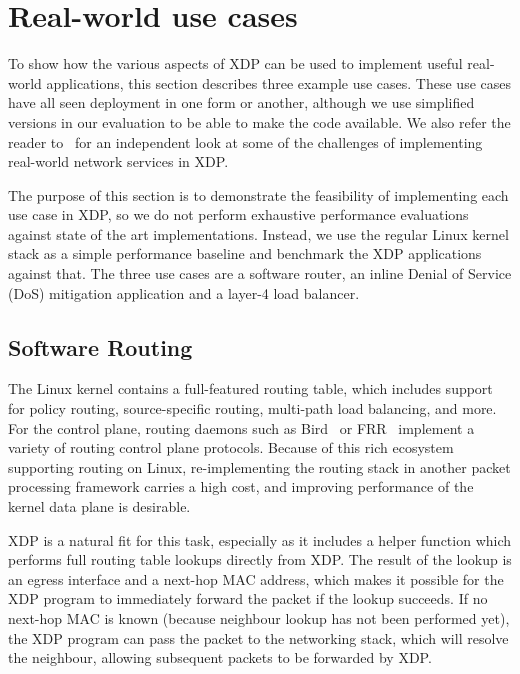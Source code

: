 \documentclass[sigconf]{acmart}
\begin{document}
\section{Real-world use cases}
\label{sec:usecases}
To show how the various aspects of XDP can be used to implement useful
real-world applications, this section describes three example use cases. These
use cases have all seen deployment in one form or another, although we use
simplified versions in our evaluation to be able to make the code available. We
also refer the reader to~\cite{miano2018creating} for an independent look at
some of the challenges of implementing real-world network services in XDP.

The purpose of this section is to demonstrate the feasibility of implementing
each use case in XDP, so we do not perform exhaustive performance evaluations
against state of the art implementations. Instead, we use the regular Linux
kernel stack as a simple performance baseline and benchmark the XDP applications
against that. The three use cases are a software router, an inline Denial of
Service (DoS) mitigation application and a layer-4 load balancer.



\subsection{Software Routing}
\label{sec:fwd-usecase}
The Linux kernel contains a full-featured routing table, which includes support
for policy routing, source-specific routing, multi-path load balancing, and more.
For the control plane, routing daemons such as Bird~\cite{bird} or
FRR~\cite{frr} implement a variety of routing control plane protocols. Because
of this rich ecosystem supporting routing on Linux, re-implementing the routing
stack in another packet processing framework carries a high cost, and improving
performance of the kernel data plane is desirable.

XDP is a natural fit for this task, especially as it includes a helper function
which performs full routing table lookups directly from XDP. The result of the
lookup is an egress interface and a next-hop MAC address, which makes it
possible for the XDP program to immediately forward the packet if the lookup
succeeds. If no next-hop MAC is known (because neighbour lookup has not been
performed yet), the XDP program can pass the packet to the networking stack,
which will resolve the neighbour, allowing subsequent packets to be forwarded by
XDP.
\end{document}
